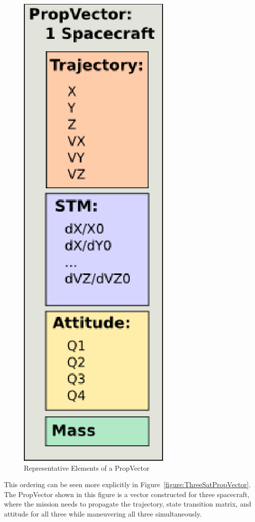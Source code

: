 \begin{figure}[htb]
\begin{center}
\includegraphics[scale=0.5]{Images/PropVectorComponents.eps}
\caption{\label{figure:PropVectorComponents}Representative Elements of a PropVector}
\end{center}
\end{figure}

This ordering can be seen more explicitly in Figure~\ref{figure:ThreeSatPropVector}.  The
PropVector shown in this figure is a vector constructed for three spacecraft, where the mission
needs to propagate the trajectory, state transition matrix, and attitude for all three while
maneuvering all three simultaneously.

